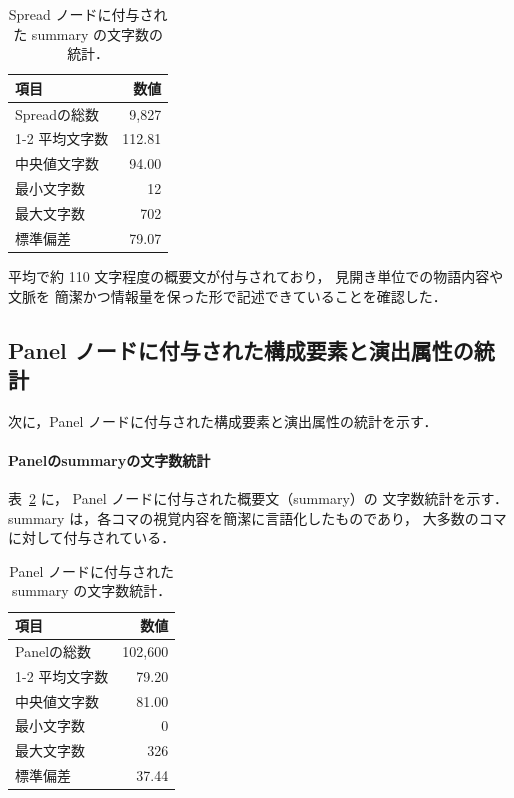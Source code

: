 \documentclass[a4j,12pt,dvipdfmx]{jsreport}
\begin{document}
\begin{table}[htbp]
   \centering
   \caption{Spread ノードに付与された summary の文字数の統計．}
   \label{tab:spread_summary_stats}
   \begin{tabular}{lr}
      \toprule
      \textbf{項目} & \textbf{数値} \\
      \midrule
      Spreadの総数   & 9{,}827     \\
      \cmidrule(lr){1-2}
      平均文字数       & 112.81      \\
      中央値文字数      & 94.00       \\
      最小文字数       & 12          \\
      最大文字数       & 702         \\
      標準偏差        & 79.07       \\
      \bottomrule
   \end{tabular}
\end{table}
平均で約 110 文字程度の概要文が付与されており，
見開き単位での物語内容や文脈を
簡潔かつ情報量を保った形で記述できていることを確認した．

\subsection{Panel ノードに付与された構成要素と演出属性の統計}
次に，Panel ノードに付与された構成要素と演出属性の統計を示す．

\paragraph{Panelのsummaryの文字数統計}
\label{sec:panel_summary_stats}
表~\ref{tab:panel_summary_stats} に，
Panel ノードに付与された概要文（summary）の
文字数統計を示す．summary は，各コマの視覚内容を簡潔に言語化したものであり，
大多数のコマに対して付与されている．

\begin{table}[htbp]
   \centering
   \caption{Panel ノードに付与された summary の文字数統計．}
   \label{tab:panel_summary_stats}
   \begin{tabular}{lr}
      \toprule
      \textbf{項目} & \textbf{数値} \\
      \midrule
      Panelの総数    & 102{,}600   \\
      \cmidrule(lr){1-2}
      平均文字数       & 79.20       \\
      中央値文字数      & 81.00       \\
      最小文字数       & 0           \\
      最大文字数       & 326         \\
      標準偏差        & 37.44       \\
      \bottomrule
   \end{tabular}
\end{table}
\end{document}
